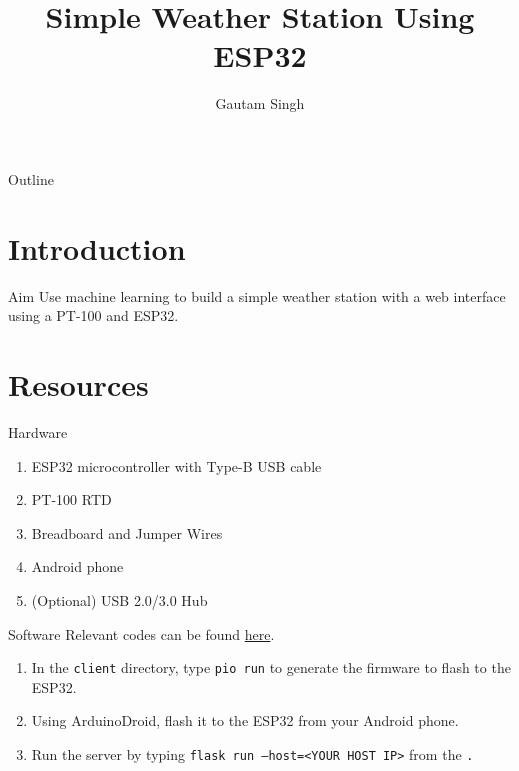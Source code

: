 \documentclass{beamer}
\title[ESP32 Weather Station]{Simple Weather Station Using ESP32}
\author{Gautam Singh}
\theoremstyle{remark}
\begin{document}
\begin{frame}
    \titlepage 
\end{frame}

\logo{}

\begin{frame}{Outline}
    \tableofcontents
\end{frame}

\section{Introduction}
\begin{frame}{Aim}
    Use machine learning to build a simple weather station  with a web interface
    using a PT-100 and ESP32.
\end{frame}

\section{Resources}
\begin{frame}{Hardware}
    \begin{enumerate}
        \item ESP32 microcontroller with Type-B USB cable
        \item PT-100 RTD
        \item Breadboard and Jumper Wires
        \item Android phone
        \item (Optional) USB 2.0/3.0 Hub
    \end{enumerate}
\end{frame}

\begin{frame}[label=software]{Software}
Relevant codes can be found 
\href{https://github.com/goats-9/ee2802-assignments/tree/main/pt100/esp32/codes}{here}.
\begin{enumerate}
    \item In the \texttt{client} directory, type \texttt{pio run} to generate the firmware to
    flash to the ESP32.
    \item Using ArduinoDroid, flash it to the ESP32 from your Android phone.
    \item Run the server by typing \texttt{flask run --host=<YOUR HOST IP>} from the \texttt.
\end{enumerate}
\end{frame}
\end{document}
